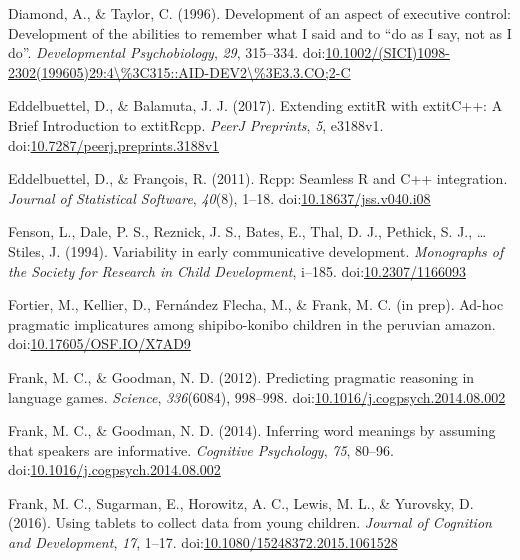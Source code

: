 \documentclass[man]{apa6}
\theoremstyle{definition}
\theoremstyle{definition}
\theoremstyle{definition}
\theoremstyle{remark}
\begin{document}
\hypertarget{ref-diamond1996}{}
Diamond, A., \& Taylor, C. (1996). Development of an aspect of executive
control: Development of the abilities to remember what I said and to
``do as I say, not as I do''. \emph{Developmental Psychobiology},
\emph{29}, 315--334.
doi:\href{https://doi.org/10.1002/(SICI)1098-2302(199605)29:4/\%3C315::AID-DEV2/\%3E3.3.CO;2-C}{10.1002/(SICI)1098-2302(199605)29:4\textbackslash{}\%3C315::AID-DEV2\textbackslash{}\%3E3.3.CO;2-C}

\hypertarget{ref-R-Rcpp_b}{}
Eddelbuettel, D., \& Balamuta, J. J. (2017). Extending extitR with
extitC++: A Brief Introduction to extitRcpp. \emph{PeerJ Preprints},
\emph{5}, e3188v1.
doi:\href{https://doi.org/10.7287/peerj.preprints.3188v1}{10.7287/peerj.preprints.3188v1}

\hypertarget{ref-R-Rcpp_a}{}
Eddelbuettel, D., \& François, R. (2011). Rcpp: Seamless R and C++
integration. \emph{Journal of Statistical Software}, \emph{40}(8),
1--18.
doi:\href{https://doi.org/10.18637/jss.v040.i08}{10.18637/jss.v040.i08}

\hypertarget{ref-fenson1994}{}
Fenson, L., Dale, P. S., Reznick, J. S., Bates, E., Thal, D. J.,
Pethick, S. J., \ldots{} Stiles, J. (1994). Variability in early
communicative development. \emph{Monographs of the Society for Research
in Child Development}, i--185.
doi:\href{https://doi.org/10.2307/1166093}{10.2307/1166093}

\hypertarget{ref-fortierunderrev}{}
Fortier, M., Kellier, D., Fernández Flecha, M., \& Frank, M. C. (in
prep). Ad-hoc pragmatic implicatures among shipibo-konibo children in
the peruvian amazon.
doi:\href{https://doi.org/10.17605/OSF.IO/X7AD9}{10.17605/OSF.IO/X7AD9}

\hypertarget{ref-frank2012}{}
Frank, M. C., \& Goodman, N. D. (2012). Predicting pragmatic reasoning
in language games. \emph{Science}, \emph{336}(6084), 998--998.
doi:\href{https://doi.org/10.1016/j.cogpsych.2014.08.002}{10.1016/j.cogpsych.2014.08.002}

\hypertarget{ref-frank2014}{}
Frank, M. C., \& Goodman, N. D. (2014). Inferring word meanings by
assuming that speakers are informative. \emph{Cognitive Psychology},
\emph{75}, 80--96.
doi:\href{https://doi.org/10.1016/j.cogpsych.2014.08.002}{10.1016/j.cogpsych.2014.08.002}

\hypertarget{ref-frank2016}{}
Frank, M. C., Sugarman, E., Horowitz, A. C., Lewis, M. L., \& Yurovsky,
D. (2016). Using tablets to collect data from young children.
\emph{Journal of Cognition and Development}, \emph{17}, 1--17.
doi:\href{https://doi.org/10.1080/15248372.2015.1061528}{10.1080/15248372.2015.1061528}
\end{document}
